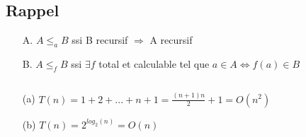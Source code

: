 \subsection*{Rappel}
\begin{framed}
\begin{itemize}
\item[A.]$A \leq_a B$ ssi B recursif $\Rightarrow$ A recursif
\item[B.]$A \leq_f B$ ssi $\exists f$ total et calculable tel que $a \in A \Leftrightarrow f(a) \in B$
\end{itemize}
\end{framed}

\subsection{}
\begin{itemize}
	\item[(a)] $T(n) = 1+2+...+n+1 = \frac{(n+1)n}{2}+1=O(n^2)$
	\item[(b)] $T(n) = 2^{log_2(n)} = O(n)$
\end{itemize}

